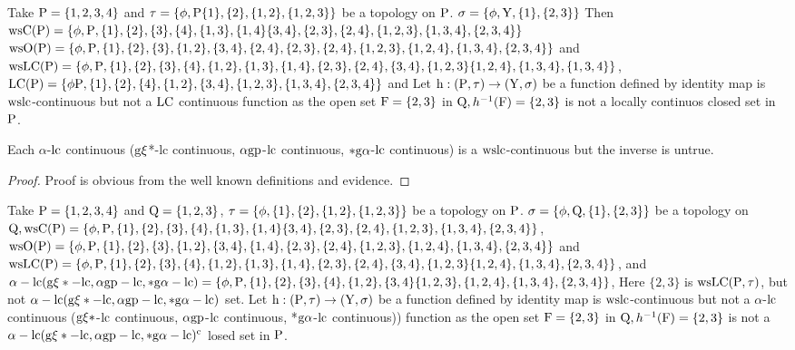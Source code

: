 \begin{exm}\label{exam6.3.4}
Take $\mathrm{P} = \{1, 2, 3, 4\}$ and $\tau = \{\phi, \mathrm{P} \{1\}, \{2\}, \{1, 2\}, \{1, 2, 3\}\}$ be a topology on $\mathrm{P}$. $\sigma = \{\phi, \mathrm{Y}, \{1\},\{ 2, 3\}\}$ Then $\ws\TSC(\TSP) = \{\phi, \TSP,\{1\}, \{2\}, \{3\}, \{4\}, \{1,3\},\break \{1, 4\} \{3,4\},\{2,3\}, \{2,4\}, \{1,2, 3\},\{1,3,4\},\{2,3,4\}\}$ $\ws\TSO(\TSP) = \{\phi, \TSP, \{1\}, \{2\}, \{3\},\break \{1,2\}, \{3,4\}, \{2,4\},\{2,3\}, \{2,4\}, \{1,2,3\}, \{1,2,4\},\{1,3,4\},\{2,3,4\}\}$ and $\ws\LC(\TSP)= \{\phi,\TSP ,\{1\}, \{2\},\{3\},\{4\},\{1,2\},\{1,3\}, \{1,4\}, \{2,3\}, \{2,4\},\{3,4\}, \{1,2,3\}\{1,2,4\},\break \{1,3,4\},\{1,3,4\}\}$, $\LC(\TSP)=\{ \phi \TSP,\{1\}, \{2\}, \{4\}, \{1, 2\}, \{3,4\}, \{1,2,3\},\{1,3,4\},\break \{2,3,4\}\}$ and Let $\mathrm{h}: (\mathrm{P}, \tau )\to(\mathrm{Y}, \sigma)$ be a function defined by identity map is $\mathrm{ws}\mathrm{lc}$-continuous but not a $\mathrm{LC}$ continuous function as the open set $\mathrm{F}=\{2,3\}$ in $\mathrm{Q}, h^{-1} (\mathrm{F})=\{2,3\}$ is not a locally continuos closed set in $\mathrm{P}$.
\end{exm}

\begin{thm}\label{thm6.3.5}
Each $\alpha$-$\mathrm{lc}$ continuous ($\mathrm{g}\xi$*-lc continuous, $\alpha\mathrm{gp}$-$\mathrm{lc}$ continuous, $*\mathrm{g}\alpha$-$\mathrm{lc}$ continuous) is a $\mathrm{ws}\mathrm{lc}$-continuous but the inverse is untrue.
\end{thm}

\begin{proof}
Proof is obvious from the well known definitions and evidence.
\end{proof}

\begin{exm}\label{exam6.3.6}
Take $\mathrm{P} = \{1, 2, 3, 4\}$ and $\mathrm{Q} = \{1, 2, 3\}$, $\tau = \{\phi, \{1\}, \{2\}, \{1, 2\},\break \{1, 2, 3\}\}$ be a topology on $\mathrm{P}$. $\sigma = \{\phi, \mathrm{Q}, \{1\},\{ 2, 3\}\}$ be a topology on $\mathrm{Q}, \mathrm{ws}\mathrm{C}(\mathrm{P}) = \{\phi, \mathrm{P},\{1\}, \{2\}, \{3\}, \{4\}, \{1,3\}, \{1, 4\} \{3,4\}, \{2,3\}, \{2,4\}, \{1,2, 3\},\{1,3,4\},\{2,3,4\}\}$,\break $\ws\TSO(\TSP) = \{\phi, \TSP, \{1\}, \{2\},\{3\},\{1,2\}, \{3,4\}, \{1,4\}, \{2,3\}, \{2,4\}, \{1,2,3\}, \{1,2,4\},\break \{1,3,4\},\{2,3,4\}\}$ and $\ws\LC(\TSP)= \{\phi, \TSP,\{1\}, \{2\}, \{3\},\{4\},\{1,2\},\{1,3\}, \{1,4\},\break \{2,3\}, \{2,4\},\{3,4\}, \{1,2,3\}\{1,2,4\},\{1,3,4\},\{2,3,4\}\}$, and $\alpha - \lc(\TSg\xi* -\lc, \alpha \gp-\lc, *\TSg\alpha-\lc) = \{ \phi, \TSP, \{1\}, \{2\}, \{3\}, \{4\}, \{1,2\}, \{3, 4\} \{1,2,3\},\{1,2,4\},\{1,3,4\},\break \{2,3,4\}\}$, Here $\{2,3\}$ is $\mathrm{ws}\mathrm{LC} (\mathrm{P}, \tau)$, but not $\alpha - \mathrm{lc}(\mathrm{g}\xi* -\mathrm{lc}, \alpha\mathrm{gp}-\mathrm{lc}, *\mathrm{g}\alpha-\mathrm{lc})$ set. Let $\mathrm{h}: (\mathrm{P}, \tau )\to(\mathrm{Y}, \sigma)$ be a function defined by identity map is $\mathrm{ws}\mathrm{lc}$-continuous but not a $\alpha$-$\mathrm{lc}$ continuous ($\mathrm{g}\xi*$-$\mathrm{lc}$ continuous, $\alpha\mathrm{gp}$-$\mathrm{lc}$ continuous, *$\mathrm{g}\alpha$-$\mathrm{lc}$ continuous)) function as the open set $\mathrm{F}=\{2,3\}$ in $\mathrm{Q}, h^{-1} (\mathrm{F})=\{2,3\}$ is not a $\alpha - \mathrm{lc}(\mathrm{g}\xi * -\mathrm{lc}, \alpha\mathrm{gp}-\mathrm{lc}, *\mathrm{g}\alpha-\mathrm{lc})^{\text{c}}$ losed set in $\mathrm{P}$.
\end{exm}

